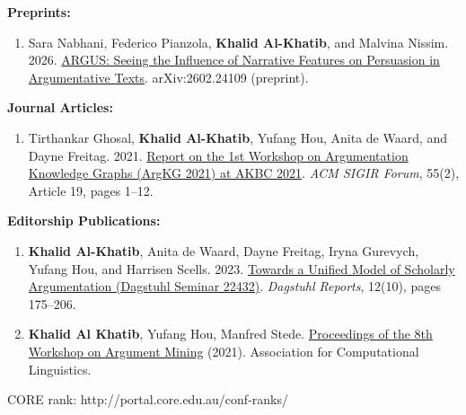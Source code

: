\textbf{Preprints:}

\begin{enumerate}
\item Sara Nabhani, Federico Pianzola, \textbf{Khalid Al-Khatib}, and Malvina Nissim. 2026. \href{https://arxiv.org/abs/2602.24109}{ARGUS: Seeing the Influence of Narrative Features on Persuasion in Argumentative Texts}. arXiv:2602.24109 (preprint).
\end{enumerate}

\textbf{Journal Articles:}

\begin{enumerate}
\item Tirthankar Ghosal, \textbf{Khalid Al-Khatib}, Yufang Hou, Anita de Waard, and Dayne Freitag. 2021. \href{https://doi.org/10.1145/3527546.3527568}{Report on the 1st Workshop on Argumentation Knowledge Graphs (ArgKG 2021) at AKBC 2021}. \textit{ACM SIGIR Forum}, 55(2), Article 19, pages 1--12.
\end{enumerate}

\textbf{Editorship Publications:}

\begin{enumerate}
\item \textbf{Khalid Al-Khatib}, Anita de Waard, Dayne Freitag, Iryna Gurevych, Yufang Hou, and Harrisen Scells. 2023. \href{https://doi.org/10.4230/DagRep.12.10.175}{Towards a Unified Model of Scholarly Argumentation (Dagstuhl Seminar 22432)}. \textit{Dagstuhl Reports}, 12(10), pages 175--206. 
\item \textbf{Khalid Al Khatib}, Yufang Hou, Manfred Stede. \href{https://aclanthology.org/2021.argmining-1.0/}{Proceedings of the 8th Workshop on Argument Mining} (2021). Association for Computational Linguistics.
\end{enumerate}
{CORE rank: http://portal.core.edu.au/conf-ranks/}
